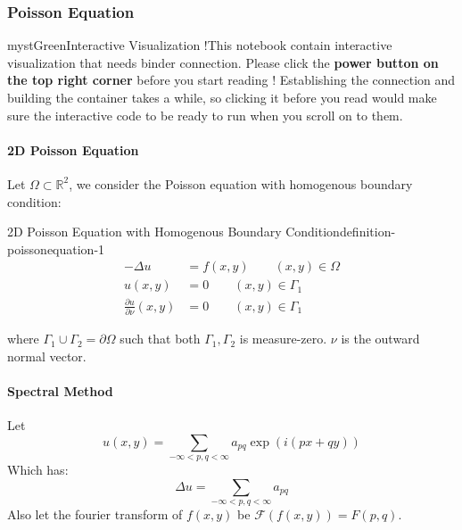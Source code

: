 \subsubsection{Poisson Equation}

\begin{mystadmonition}{mystGreen}{Interactive Visualization !}This notebook contain interactive visualization that needs binder connection. Please click the \textbf{power button on the top right corner} before you start reading ! Establishing the connection and building the container takes a while, so clicking it before you read would make sure the interactive code to be ready to run when you scroll on to them.

\end{mystadmonition}
\paragraph{2D Poisson Equation}

Let $\Omega \subset \mathbb{R}^2$, we consider the Poisson equation with homogenous boundary condition:

\begin{mystthmdefinition}{2D Poisson Equation with Homogenous Boundary Condition}{definition-poissonequation-1}\begin{equation}
\label{2dpoihb}
\begin{aligned}
-\Delta u &= f(x,y) \qquad (x,y)\in \Omega \\
  u(x,y) &= 0 \qquad (x,y)\in \Gamma_1 \\
  \frac{\partial u}{\partial \nu}(x,y) &= 0 \qquad (x,y)\in \Gamma_1
\end{aligned}
\end{equation}

\end{mystthmdefinition}
where $\Gamma_1\cup \Gamma_2 = \partial \Omega$ such that both $\Gamma_1, \Gamma_2$ is measure-zero. $\nu$ is the outward normal vector.

\paragraph{Spectral Method}

Let
\begin{equation}
u(x,y)=\sum_{-\infty<p,q<\infty} a_{pq}  \exp(i(px +qy))
\end{equation}
Which has:
\begin{equation}
\Delta u = \sum_{-\infty<p,q<\infty} a_{pq}
\end{equation}
Also let the fourier transform of $f(x,y)$ be $\mathcal F (f(x,y))=F(p,q)$.

